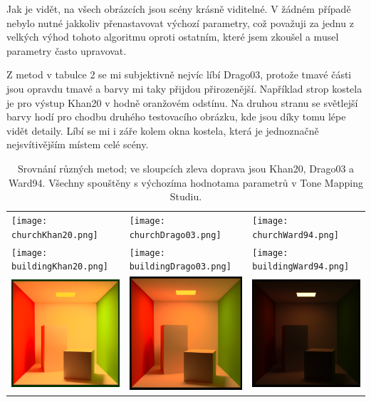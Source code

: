 \documentclass[11pt,a4paper,oneside]{article}
\begin{document}
Jak je vidět, na všech obrázcích jsou scény krásně viditelné. V žádném případě
nebylo nutné jakkoliv přenastavovat výchozí parametry, což považuji za jednu z
velkých výhod tohoto algoritmu oproti ostatním, které jsem zkoušel a musel
parametry často upravovat.

Z metod v tabulce 2 se mi subjektivně nejvíc líbí Drago03, protože tmavé části
jsou opravdu tmavé a barvy mi taky přijdou přirozenější. Například strop kostela je 
pro výstup Khan20 v hodně oranžovém odstínu. Na druhou stranu se světlejší barvy hodí pro chodbu
druhého testovacího obrázku, kde jsou díky tomu lépe vidět detaily. Líbí se mi i
záře kolem okna kostela, která je jednoznačně nejsvítivějším místem celé scény.

\begin{table}[htb]
    \centering
    \caption{Srovnání různých metod; ve sloupcích zleva doprava jsou Khan20,
    Drago03 a Ward94. Všechny spouštěny s výchozíma hodnotama parametrů v Tone Mapping
    Studiu.}
    \label{tab:method-comp}
    \begin{tabular}{lll}
        \texttt{[image: churchKhan20.png]} &
        \texttt{[image: churchDrago03.png]} &
        \texttt{[image: churchWard94.png]} \\
    \texttt{[image: buildingKhan20.png]} &
        \texttt{[image: buildingDrago03.png]} &
        \texttt{[image: buildingWard94.png]}\\
    \includegraphics[width=.33\linewidth,valign=m]{cornell_boxKhan20.png} &
        \includegraphics[width=.33\linewidth,valign=m]{cornell_boxDrago03.png} &
        \includegraphics[width=.33\linewidth,valign=m]{cornell_boxWard94.png}\\
    \end{tabular}
\end{table}
\end{document}
